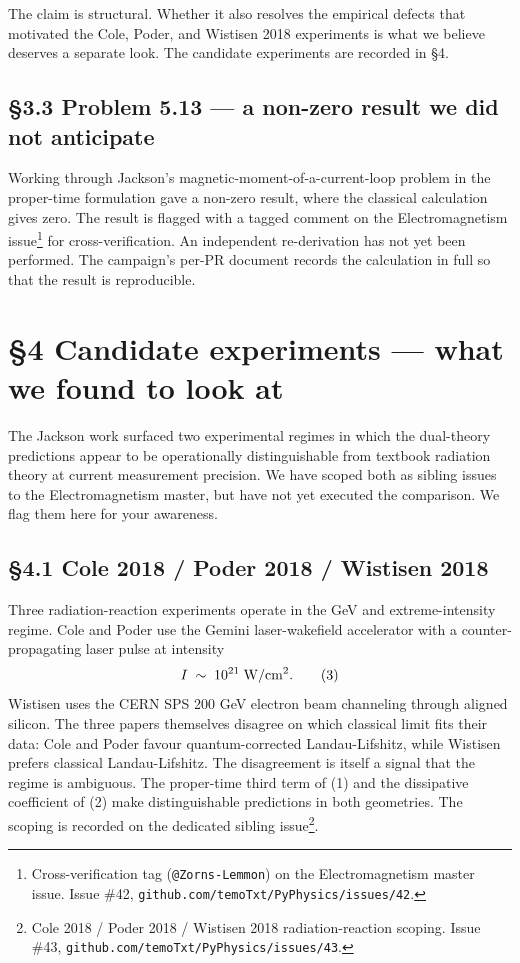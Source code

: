 \documentclass[
  11pt,
]{article}
\begin{document}
The claim is structural. Whether it also resolves the empirical defects
that motivated the Cole, Poder, and Wistisen 2018 experiments is what we
believe deserves a separate look. The candidate experiments are recorded
in §4.

\hypertarget{problem-5.13-a-non-zero-result-we-did-not-anticipate}{%
\subsection{§3.3 Problem 5.13 --- a non-zero result we did not
anticipate}\label{problem-5.13-a-non-zero-result-we-did-not-anticipate}}

Working through Jackson's magnetic-moment-of-a-current-loop problem in
the proper-time formulation gave a non-zero result, where the classical
calculation gives zero. The result is flagged with a tagged comment on
the Electromagnetism issue\footnote{Cross-verification tag
  (\texttt{@Zorns-Lemmon}) on the Electromagnetism master issue. Issue
  \#42, \texttt{github.com/temoTxt/PyPhysics/issues/42}.} for
cross-verification. An independent re-derivation has not yet been
performed. The campaign's per-PR document records the calculation in
full so that the result is reproducible.

\hypertarget{candidate-experiments-what-we-found-to-look-at}{%
\section{§4 Candidate experiments --- what we found to look
at}\label{candidate-experiments-what-we-found-to-look-at}}

The Jackson work surfaced two experimental regimes in which the
dual-theory predictions appear to be operationally distinguishable from
textbook radiation theory at current measurement precision. We have
scoped both as sibling issues to the Electromagnetism master, but have
not yet executed the comparison. We flag them here for your awareness.

\hypertarget{cole-2018-poder-2018-wistisen-2018}{%
\subsection{§4.1 Cole 2018 / Poder 2018 / Wistisen
2018}\label{cole-2018-poder-2018-wistisen-2018}}

Three radiation-reaction experiments operate in the GeV and
extreme-intensity regime. Cole and Poder use the Gemini laser-wakefield
accelerator with a counter-propagating laser pulse at intensity \[
I \;\sim\; 10^{21}\;{\rm W/cm^{2}}.
\tag{3}
\] Wistisen uses the CERN SPS 200 GeV electron beam channeling through
aligned silicon. The three papers themselves disagree on which classical
limit fits their data: Cole and Poder favour quantum-corrected
Landau-Lifshitz, while Wistisen prefers classical Landau-Lifshitz. The
disagreement is itself a signal that the regime is ambiguous. The
proper-time third term of (1) and the dissipative coefficient of (2)
make distinguishable predictions in both geometries. The scoping is
recorded on the dedicated sibling issue\footnote{Cole 2018 / Poder 2018
  / Wistisen 2018 radiation-reaction scoping. Issue \#43,
  \texttt{github.com/temoTxt/PyPhysics/issues/43}.}.
\end{document}
